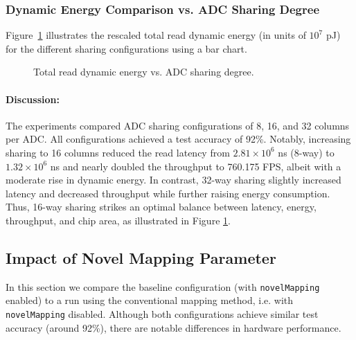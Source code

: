 \documentclass[11pt]{article}
\begin{document}
\subsubsection{Dynamic Energy Comparison vs. ADC Sharing Degree}
Figure~\ref{fig:sharing_energy_bar} illustrates the rescaled total read dynamic energy (in units of $10^7$ pJ) for the different sharing configurations using a bar chart.

\begin{figure}[H]
    \centering
    \caption{Total read dynamic energy vs. ADC sharing degree.}
    \label{fig:sharing_energy_bar}
\end{figure}

\paragraph{Discussion:}
The experiments compared ADC sharing configurations of 8, 16, and 32 columns per ADC. All configurations achieved a test accuracy of 92\%. Notably, increasing sharing to 16 columns reduced the read latency from $2.81\times10^6$ ns (8-way) to $1.32\times10^6$ ns and nearly doubled the throughput to 760.175 FPS, albeit with a moderate rise in dynamic energy. In contrast, 32-way sharing slightly increased latency and decreased throughput while further raising energy consumption. Thus, 16-way sharing strikes an optimal balance between latency, energy, throughput, and chip area, as illustrated in Figure \ref{fig:sharing_energy_bar}.


\subsection{Impact of Novel Mapping Parameter} \label{section:mapping_param}
In this section we compare the baseline configuration (with \texttt{novelMapping} enabled) to a run using the conventional mapping method, i.e. with \texttt{novelMapping} disabled. Although both configurations achieve similar test accuracy (around 92\%), there are notable differences in hardware performance.
\end{document}
